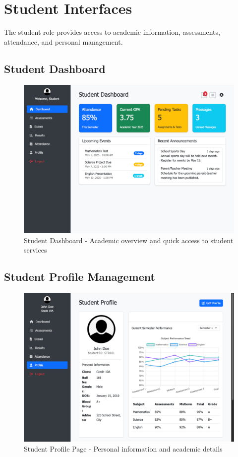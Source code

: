 \documentclass[12pt,a4paper]{article}
\begin{document}
\section{Student Interfaces}

The student role provides access to academic information, assessments, attendance, and personal management.

\subsection{Student Dashboard}
\begin{figure}[H]
    \centering
    \includegraphics[width=\textwidth]{student/student-dashboard-page.png}
    \caption{Student Dashboard - Academic overview and quick access to student services}
    \label{fig:student-dashboard}
\end{figure}

\subsection{Student Profile Management}
\begin{figure}[H]
    \centering
    \includegraphics[width=\textwidth]{student/student-profile-page.png}
    \caption{Student Profile Page - Personal information and academic details}
    \label{fig:student-profile}
\end{figure}
\end{document}

